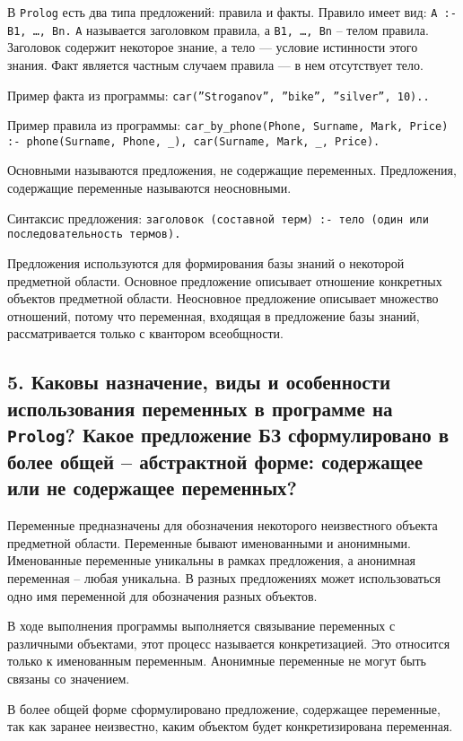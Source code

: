 В \texttt{Prolog} есть два типа предложений: правила и факты. Правило имеет вид: \texttt{A :- B1, \ldots, Bn.} 
\texttt{A} называется заголовком правила, а \texttt{B1, \ldots, Bn} – телом правила. Заголовок содержит некоторое знание, а тело --- условие истинности этого знания. Факт является частным случаем правила --- в нем отсутствует тело.

Пример факта из программы: \texttt{car(''Stroganov'', ''bike'', ''silver'', 10)..}


Пример правила из программы: \texttt{car\_by\_phone(Phone, Surname, Mark, Price) :- phone(Surname, Phone, \_), car(Surname, Mark, \_, Price).}

Основными называются предложения, не содержащие переменных. Предложения, содержащие переменные называются неосновными. 

Синтаксис предложения: \texttt{заголовок (составной терм) :- тело (один или последовательность термов).} 

Предложения используются для формирования базы знаний о некоторой предметной области. Основное предложение описывает отношение конкретных объектов предметной области. Неосновное предложение описывает множество отношений, потому что переменная, входящая в предложение базы знаний, рассматривается только с квантором всеобщности.

\subsection*{5. Каковы назначение, виды и особенности использования переменных в программе на \texttt{Prolog}? Какое предложение БЗ сформулировано в более общей – абстрактной форме: содержащее или не содержащее переменных?}

Переменные предназначены для обозначения некоторого неизвестного объекта предметной области. Переменные бывают именованными и анонимными. Именованные переменные уникальны в рамках предложения, а анонимная переменная – любая уникальна. В разных предложениях может использоваться одно имя переменной для обозначения разных объектов.

В ходе выполнения программы выполняется связывание переменных с различными объектами, этот процесс называется конкретизацией. Это относится только к именованным переменным. Анонимные переменные не могут быть связаны со значением.

В более общей форме сформулировано предложение, содержащее переменные, так как заранее неизвестно, каким объектом будет конкретизирована переменная.

